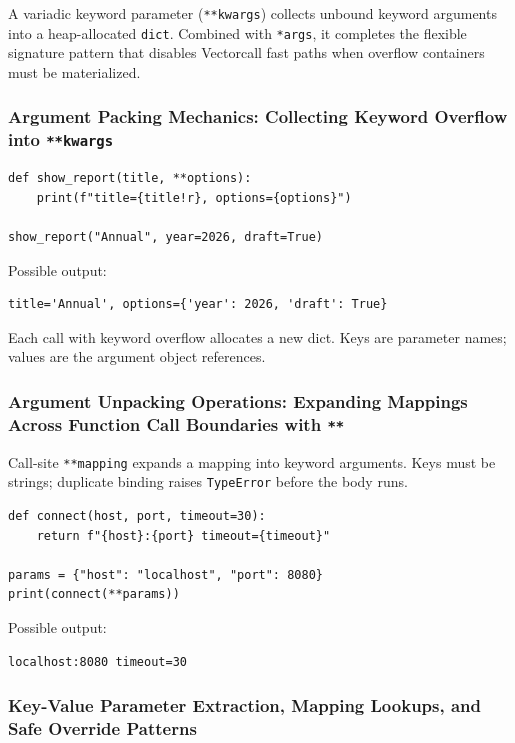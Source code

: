 \documentclass[a4paper,twoside]{report}
\begin{document}
A variadic keyword parameter (\texttt{**kwargs}) collects unbound keyword arguments into a heap-allocated \texttt{dict}. Combined with \texttt{*args}, it completes the flexible signature pattern that disables Vectorcall fast paths when overflow containers must be materialized.

\subsubsection{Argument Packing Mechanics: Collecting Keyword Overflow into \texttt{**kwargs}}

\begin{verbatim}
def show_report(title, **options):
    print(f"title={title!r}, options={options}")

show_report("Annual", year=2026, draft=True)
\end{verbatim}

Possible output:

\begin{verbatim}
title='Annual', options={'year': 2026, 'draft': True}
\end{verbatim}

Each call with keyword overflow allocates a new dict. Keys are parameter names; values are the argument object references.

\subsubsection{Argument Unpacking Operations: Expanding Mappings Across Function Call Boundaries with \texttt{**}}

Call-site \texttt{**mapping} expands a mapping into keyword arguments. Keys must be strings; duplicate binding raises \texttt{TypeError} before the body runs.

\begin{verbatim}
def connect(host, port, timeout=30):
    return f"{host}:{port} timeout={timeout}"

params = {"host": "localhost", "port": 8080}
print(connect(**params))
\end{verbatim}

Possible output:

\begin{verbatim}
localhost:8080 timeout=30
\end{verbatim}

\subsubsection{Key-Value Parameter Extraction, Mapping Lookups, and Safe Override Patterns}
\end{document}
